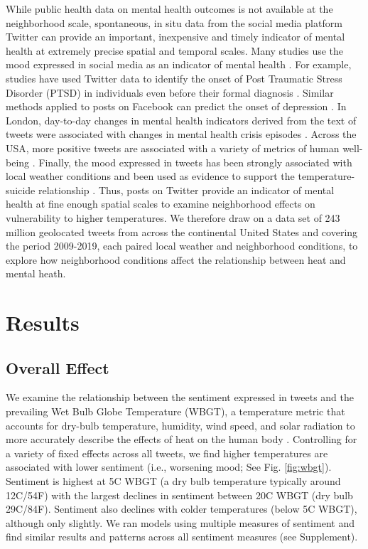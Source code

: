 \documentclass[fleqn,10pt]{wlscirep}
\begin{document}
While public health data on mental health outcomes is not available at the neighborhood scale, spontaneous, in situ data from the social media platform Twitter can provide an important, inexpensive and timely indicator of mental health at extremely precise spatial and temporal scales. Many studies use the mood expressed in social media as an indicator of mental health \cite{Edo-Osagie2020Jul, Sinnenberg2016Dec}. For example, studies have used Twitter data to identify the onset of Post Traumatic Stress Disorder (PTSD) in individuals even before their formal diagnosis \cite{Reece2017Oct}. Similar methods applied to posts on Facebook can predict the onset of depression \cite{Eichstaedt2018Oct}. In London, day-to-day changes in mental health indicators derived from the text of tweets were associated with changes in mental health crisis episodes \cite{Kolliakou2020Feb}. Across the USA, more positive tweets are associated with a variety of metrics of human well-being \cite{Mitchell2013May}. Finally, the mood expressed in tweets has been strongly associated with local weather conditions \cite{baylis_weather_2018, hannak_tweetin_2012} and been used as evidence to support the temperature-suicide relationship \cite{Burke2018Aug}. Thus, posts on Twitter provide an indicator of mental health at fine enough spatial scales to examine neighborhood effects on vulnerability to higher temperatures. We therefore draw on a data set of 243 million geolocated tweets from across the continental United States and covering the period 2009-2019, each paired local weather and neighborhood conditions, to explore how neighborhood conditions affect the relationship between heat and mental heath.

\section*{Results}

\subsection*{Overall Effect}
We examine the relationship between the sentiment expressed in tweets and the prevailing Wet Bulb Globe Temperature (WBGT), a temperature metric that accounts for dry-bulb temperature, humidity, wind speed, and solar radiation to more accurately describe the effects of heat on the human body \cite{budd2008wet}. Controlling for a variety of fixed effects across all tweets, we find higher temperatures are associated with lower sentiment (i.e., worsening mood; See Fig. \ref{fig:wbgt}).  Sentiment is highest at 5\textdegree C WBGT (a dry bulb temperature typically around 12\textdegree C/54\textdegree F) with the largest declines in sentiment between 20\textdegree C WBGT (dry bulb 29\textdegree C/84\textdegree F). Sentiment also declines with colder temperatures (below 5\textdegree C WBGT), although only slightly. We ran models using multiple measures of sentiment and find similar results and patterns across all sentiment measures (see Supplement).
\end{document}
